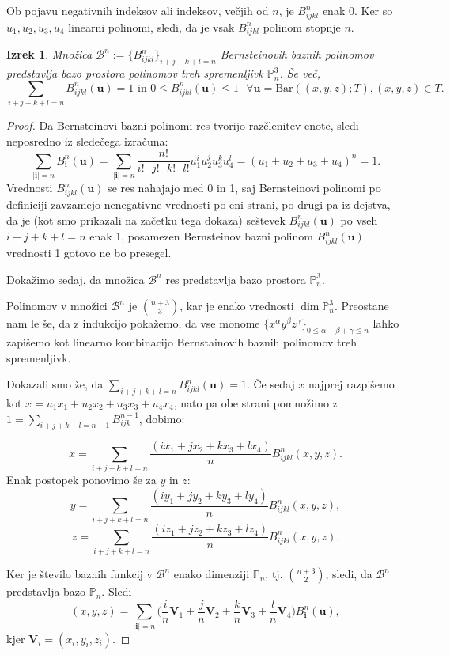 \documentclass[a4paper, 12pt]{article}
\theoremstyle{definition} %
\theoremstyle{plain} %
\newtheorem{theorem}{Izrek}[section]
\begin{document}
Ob pojavu negativnih indeksov ali indeksov, večjih od $n$, je $B_{ijkl}^n$ enak 0.
Ker so $u_1,u_2,u_3,u_4$ linearni polinomi, sledi,
da je vsak $B_{ijkl}^n$ polinom stopnje $n$. 

\begin{theorem}
  Množica $\mathcal{B}^n := \{B_{ijkl}^n\}_{i+j+k+l=n}$
  Bernsteinovih baznih polinomov predstavlja bazo 
  prostora polinomov treh spremenljivk $\mathbb{P}_n^3$.
  Še več,
  $$
  \sum_{i+j+k+l=n}B^n_{ijkl}(\textbf{u})=1
  \text{ in }
  0\leq B_{ijkl}^n(\textbf{u})\leq 1\text{ }\forall \textbf{u}=\text{Bar}{((x,y,z);T)}, (x,y,z)\in T.$$
\end{theorem}

\begin{proof}
  Da Bernsteinovi bazni polinomi res tvorijo razčlenitev enote, sledi neposredno iz 
  sledečega izračuna:
  $$\sum_{|\textbf{i}|=n}B_{\textbf{i}}^n(\textbf{u})=
  \sum_{|\textbf{i}|=n}\frac{n!}{i!\text{ }j!\text{ }k!\text{ }l!}u_1^iu_2^ju_3^ku_4^l=
  (u_1+u_2+u_3+u_4)^n = 1.
  $$
  Vrednosti $B_{ijkl}^n(\textbf{u})$ se res nahajajo med 0 in 1, 
  saj Bernsteinovi polinomi po definiciji zavzamejo nenegativne vrednosti po eni strani, 
  po drugi pa iz dejstva, da je (kot smo prikazali na začetku tega dokaza) seštevek 
  $B_{ijkl}^n(\textbf{u})$ po vseh $i+j+k+l=n$ enak 1, posamezen Bernsteinov 
  bazni polinom $B_{ijkl}^n(\textbf{u})$ vrednosti 1 gotovo ne bo presegel.

  Dokažimo sedaj, da množica $\mathcal{B}^n$ res predstavlja bazo prostora $\mathbb{P}_n^3$.
  
  Polinomov v množici $\mathcal{B}^n$ je $\binom{n+3}{3}$, kar je enako vrednosti $\dim{\mathbb{P}^3_n}$.
  Preostane nam le še, da z indukcijo pokažemo, 
  da vse monome $\{x^\alpha y^\beta z^\gamma\}_{0\leq \alpha+\beta+\gamma\leq n}$ 
  lahko zapišemo kot linearno kombinacijo Bernstainovih baznih polinomov treh spremenljivk.
  
  Dokazali smo že, da $\sum_{i+j+k+l=n}B^n_{ijkl}(\textbf{u})=1$.
  Če sedaj $x$ najprej razpišemo kot $x=u_1x_1+u_2x_2+u_3x_3+u_4x_4$, nato 
  pa obe strani pomnožimo z
  $1 = \sum_{i+j+k+l=n-1}B_{ijk}^{n-1}$, dobimo:

  $$
  x = \sum_{i+j+k+l=n}\frac{(ix_1+jx_2+kx_3+lx_4)}{n}B_{ijkl}^n(x,y,z).
  $$
  Enak postopek ponovimo še za $y$ in $z$:
  $$
  y = \sum_{i+j+k+l=n}\frac{(iy_1+jy_2+ky_3+ly_4)}{n}B_{ijkl}^n(x,y,z),
  $$
  $$
  z = \sum_{i+j+k+l=n}\frac{(iz_1+jz_2+kz_3+lz_4)}{n}B_{ijkl}^n(x,y,z).
  $$

  Ker je število baznih funkcij v $\mathcal{B}^n$ enako 
  dimenziji $\mathbb{P}_n$, tj. $\binom{n+3}{2}$, sledi, da  
  $\mathcal{B}^n$ predstavlja bazo $\mathbb{P}_n$.
  Sledi 
  $$
  (x,y,z) = 
  \sum_{|\textbf{i}| = n}\bigl(\frac{i}{n}\textbf{V}_1+\frac{j}{n}\textbf{V}_2+\frac{k}{n}\textbf{V}_3+\frac{l}{n}\textbf{V}_4\bigr)B_{\textbf{i}}^n(\textbf{u}),$$
  kjer $\textbf{V}_i = (x_i,y_i,z_i)$.


\end{proof}
\end{document}
